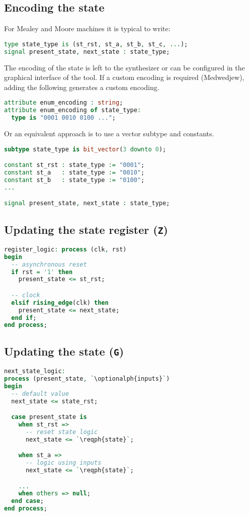 \subsection{Encoding the state} \label{sec:fsm:encode}
For Mealey and Moore machines it is typical to write:
\begin{lstlisting}[language=vhdl]
type state_type is (st_rst, st_a, st_b, st_c, ...);
signal present_state, next_state : state_type;
\end{lstlisting}
The encoding of the state is left to the synthesizer or can be configured in
the graphical interface of the tool.  If a custom encoding is required
(Medwedjew), adding the following generates a custom encoding.
\begin{lstlisting}[language=vhdl]
attribute enum_encoding : string;
attribute enum_encoding of state_type:
  type is "0001 0010 0100 ...";
\end{lstlisting}
Or an equivalent approach is to use a vector subtype and constants.
\begin{lstlisting}[language=vhdl]
subtype state_type is bit_vector(3 downto 0);

constant st_rst : state_type := "0001";
constant st_a   : state_type := "0010";
constant st_b   : state_type := "0100";
...

signal present_state, next_state : state_type;
\end{lstlisting}

\subsection{Updating the state register (\texttt{Z})}
\begin{lstlisting}[language=vhdl]
register_logic: process (clk, rst)
begin
  -- asynchronous reset
  if rst = '1' then
    present_state <= st_rst;

  -- clock
  elsif rising_edge(clk) then
    present_state <= next_state;
  end if;
end process;
\end{lstlisting}

\subsection{Updating the state (\texttt{G})}
\begin{lstlisting}[language=vhdl]
next_state_logic:
process (present_state, `\optionalph{inputs}`)
begin
  -- default value
  next_state <= state_rst;

  case present_state is
    when st_rst =>
      -- reset state logic
      next_state <= `\reqph{state}`;

    when st_a =>
      -- logic using inputs
      next_state <= `\reqph{state}`;

    ...
    when others => null;
  end case;
end process;
\end{lstlisting}

